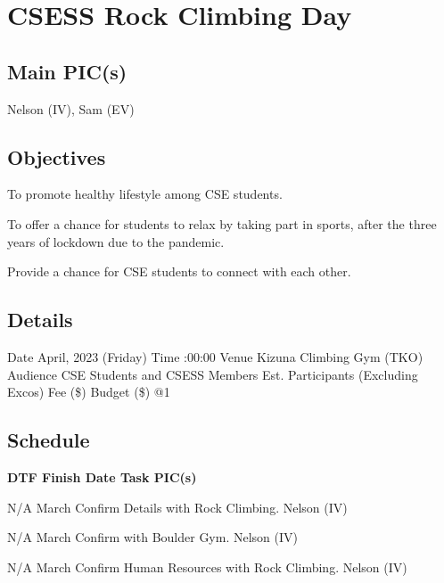 \section{CSESS Rock Climbing Day}

\subsection{Main PIC(s)}
Nelson (IV), Sam (EV)

\subsection{Objectives}
\startitemize
\item To promote healthy lifestyle among CSE students.
\item To offer a chance for students to relax by taking part in sports, after the three years of lockdown due to the pandemic.
\item Provide a chance for CSE students to connect with each other.
\stopitemize

\subsection{Details}
\starttabulate[|rB|l|]
\NC Date
 April, 2023 (Friday) \NR
\NC Time
:00:00 \NR
\NC Venue
\NC Kizuna Climbing Gym (TKO) \NR
\NC Audience
\NC CSE Students and CSESS Members \NR
\NC Est. Participants
 (Excluding Excos) \NR
\NC Fee (\$)
 \NR
\NC Budget (\$)
@1 \NR
\stoptabulate

\subsection{Schedule}

\setupTABLE[c][1][width=0.75in]
\setupTABLE[c][2][width=1in]
\setupTABLE[c][3][width=3in]
\setupTABLE[c][4][width=1.25in]
\bTABLE
\bTABLEhead

\bTR\bTH    \bf{DTF}
\eTH\bTH    \bf{Finish Date}
\eTH\bTH    \bf{Task}
\eTH\bTH    \bf{PIC(s)}
\eTH\eTR

\eTABLEhead
\bTABLEbody

\bTR\bTD N/A
\eTD{} March
\eTD\bTD Confirm Details with Rock Climbing.
\eTD\bTD Nelson (IV)
\eTD\eTR

\bTR\bTD N/A
\eTD{} March
\eTD\bTD Confirm with Boulder Gym.
\eTD\bTD Nelson (IV)
\eTD\eTR

\bTR\bTD N/A
\eTD{} March
\eTD\bTD Confirm Human Resources with Rock Climbing.
\eTD\bTD Nelson (IV)
\eTD\eTR


